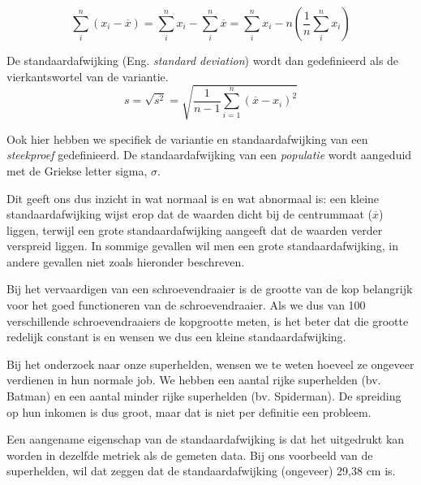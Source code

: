 \begin{equation}
 \sum_{i}^{n}(x_{i} - \overline{x}) = \sum_{i}^{n}x_{i} - \sum_{i}^{n}\overline{x} = \sum_{i}^{n}x_{i} - n \left(\frac{1}{n}\sum_{i}^{n} x_{i}\right)
\label{eq:sumGemid}
\end{equation}

\begin{definition}[Standaardafwijking]
  De  standaardafwijking (Eng. \emph{standard deviation}) wordt dan gedefinieerd als de vierkantswortel van de variantie.
  \begin{equation}
  s = \sqrt{s^{2}} = \sqrt{\frac{1}{n-1} \sum_{i=1}^{n} \left(\overline{x} - x_i \right)^{2}}
  \label{eq:stdev}
  \end{equation}
\end{definition}

\begin{remark}[!!]
  Ook hier hebben we specifiek de variantie en standaardafwijking van een \emph{steekproef} gedefinieerd. De standaardafwijking van een \emph{populatie} wordt aangeduid met de Griekse letter sigma, $\sigma$.
\end{remark}

Dit geeft ons dus inzicht in wat normaal is en wat abnormaal is: een kleine standaardafwijking wijst erop dat de waarden dicht bij de centrummaat ($\overline{x}$) liggen, terwijl een grote standaardafwijking aangeeft dat de waarden verder verspreid liggen. In sommige gevallen wil men een grote standaardafwijking, in andere gevallen niet zoals hieronder beschreven.

\begin{example}
  Bij het vervaardigen van een schroevendraaier is de grootte van de kop belangrijk voor het goed functioneren van de schroevendraaier. Als we dus van 100 verschillende schroevendraaiers de kopgrootte meten, is het beter dat die grootte redelijk constant is en wensen we dus een kleine standaardafwijking.
\end{example}

\begin{example}
  Bij het onderzoek naar onze superhelden, wensen we te weten hoeveel ze ongeveer verdienen in hun normale job. We hebben een aantal rijke superhelden (bv. Batman) en een aantal minder rijke superhelden (bv. Spiderman). De spreiding op hun inkomen is dus groot, maar dat is niet per definitie een probleem.
\end{example}

Een aangename eigenschap van de standaardafwijking is dat het uitgedrukt kan worden in dezelfde metriek als de gemeten data. Bij ons voorbeeld van de superhelden, wil dat zeggen dat de standaardafwijking (ongeveer) 29,38 cm is.

